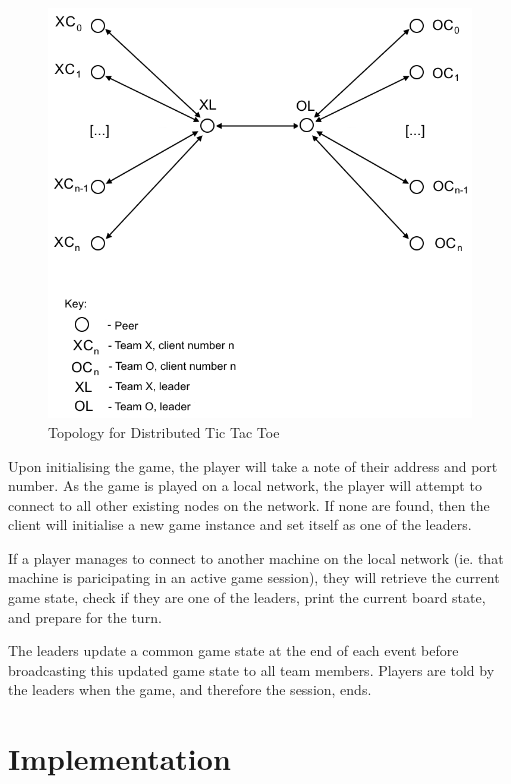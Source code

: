\documentclass[conference]{IEEEtran}
\begin{document}
\begin{figure}[h]
	\includegraphics[width=\linewidth]{images/DAS-topology.png}
	\caption{Topology for Distributed Tic Tac Toe}
	\label{fig:topology1}
\end{figure}

Upon initialising the game, the player will take a note of their address and port number. As the game is played on a local network, the player will attempt to connect to all other existing nodes on the network. If none are found, then the client will initialise a new game instance and set itself as one of the leaders.

If a player manages to connect to another machine on the local network (ie. that machine is paricipating in an active game session), they will retrieve the current game state, check if they are one of the leaders, print the current board state, and prepare for the turn.

The leaders update a common game state at the end of each event before broadcasting this updated game state to all team members. Players are told by the leaders when the game, and therefore the session, ends.

\section{Implementation}
\end{document}
